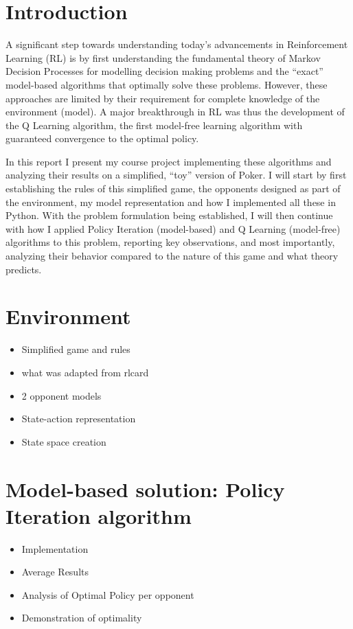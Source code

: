 \section{Introduction}

A significant step towards understanding today's advancements in Reinforcement Learning (RL) is by first understanding the fundamental theory of Markov Decision Processes for modelling decision making problems and the ``exact'' model-based algorithms that optimally solve these problems. However, these approaches are limited by their requirement for complete knowledge of the environment (model). A major breakthrough in RL was thus the development of the Q Learning algorithm, the first model-free learning algorithm with guaranteed convergence to the optimal policy.

In this report I present my course project implementing these algorithms and analyzing their results on a simplified, ``toy'' version of Poker. I will start by first establishing the rules of this simplified game, the opponents designed as part of the environment, my model representation and how I implemented all these in Python. With the problem formulation being established, I will then continue with how I applied Policy Iteration (model-based) and Q Learning (model-free) algorithms to this problem, reporting key observations, and most importantly, analyzing their behavior compared to the nature of this game and what theory predicts.

\section{Environment}

\begin{itemize}
\item Simplified game and rules
\item what was adapted from rlcard
\item 2 opponent models
\item State-action representation
\item State space creation
\end{itemize}

\section{Model-based solution: Policy Iteration algorithm}

\begin{itemize}
\item Implementation
\item Average Results
\item Analysis of Optimal Policy per opponent
\item Demonstration of optimality
\end{itemize}


